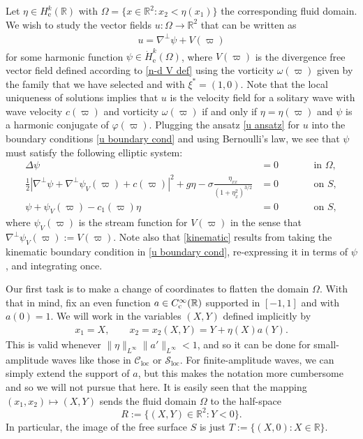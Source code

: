 \documentclass[11pt,reqno]{amsart}
\newcommand{\R}{\mathbb{R}}
\newcommand{\n}[2][]{#1\lVert #2 #1\rVert}
\theoremstyle{plain}
\theoremstyle{remark}
\numberwithin{equation}{section}
\begin{document}
Let $\eta \in H_{\mathrm{e}}^k(\R)$ with $\Omega = \{ x \in \R^2 : x_2 < \eta(x_1) \}$ the corresponding fluid domain. We wish to study the vector fields $u :\Omega \to \R^2$ that can be written as
\begin{align}
  \label{u ansatz}
  u = \nabla^\perp \psi + V(\varpi)
\end{align}
for some harmonic function $\psi \in \dot{H}_{\mathrm{e}}^k(\Omega)$, where $V(\varpi)$ is the divergence free vector field defined according to \eqref{n-d V def} using the vorticity $\omega(\varpi)$ given by the family that we have selected and with $\xi^* = (1,0)$.   Note that the local uniqueness of solutions implies that $u$ is the velocity field for a solitary wave with wave velocity $c(\varpi)$ and vorticity $\omega(\varpi)$ if and only if $\eta = \eta(\varpi)$ and $\psi$ is a harmonic conjugate of $\varphi(\varpi)$.   Plugging the ansatz \eqref{u ansatz} for $u$ into the boundary conditions \eqref{u boundary cond} and using Bernoulli's law, we see that $\psi$ must satisfy the following elliptic system:
\begin{subequations} \label{existence: psi Eulerian equation}
  \begin{alignat}{2}
    \label{laplace}
    \Delta\psi &= 0 &\qquad& \textrm{in } \Omega, \\
    \label{dynamic}
    \frac 12 |\nabla^\perp\psi + \nabla^\perp \psi_V(\varpi) + c(\varpi)|^2 + g\eta -\sigma 
    \frac{\eta_{xx}}{(1+\eta_x^2)^{3/2}}
     &= 0 && \textrm{on } S,\\
    \label{kinematic}
    \psi + \psi_V(\varpi) - c_1(\varpi)\eta &= 0
    && \textrm{on } S,
  \end{alignat}
\end{subequations}
where $\psi_V(\varpi)$ is the stream function for $V(\varpi)$ in the sense that $\nabla^\perp \psi_V(\varpi) := V(\varpi)$. Note also that  \eqref{kinematic} results from taking the kinematic boundary condition in \eqref{u boundary cond}, re-expressing it in terms of $\psi$, and integrating once.  

Our first task is to make a change of coordinates to flatten the domain $\Omega$.  With that in mind, fix an even function $a \in C^\infty_\textup{c}(\R)$ supported in
$[-1,1]$ and with $a(0) = 1$.  We will work in the variables $(X,Y)$ defined
implicitly by
\begin{align*}
  x_1 = X,
  \qquad 
  x_2 = x_2(X,Y) = Y+\eta(X)a(Y).
\end{align*}
This is valid whenever $\n\eta_{L^\infty}
\n{a'}_{L^\infty} < 1$, and so it can be done for small-amplitude waves like those in $\mathscr{C}_{\mathrm{loc}}$ or $\mathscr{S}_{\mathrm{loc}}$. For finite-amplitude waves, we can simply extend the support of $a$, but this makes
the notation more cumbersome and so we will not pursue that here. It is easily seen that the mapping $(x_1, x_2) \mapsto (X,Y)$ sends the fluid domain $\Omega$ to the
half-space 
\[ R := \{(X,Y) \in \R^2 : Y < 0\}.\]
In particular, the image of the free surface $S$ is just $T := \{ (X,0) : X \in \R\}$.
\end{document}
